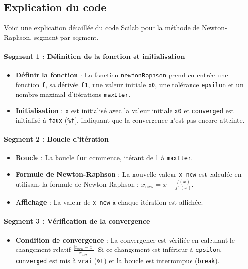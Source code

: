 \documentclass{article}
\begin{document}
\subsection{Explication du code}

Voici une explication détaillée du code Scilab pour la méthode de Newton-Raphson, segment par segment.

\paragraph{Segment 1 : Définition de la fonction et initialisation}
\begin{itemize}
    \item \textbf{Définir la fonction} : La fonction \texttt{newtonRaphson} prend en entrée une fonction \texttt{f}, sa dérivée \texttt{f1}, une valeur initiale \texttt{x0}, une tolérance \texttt{epsilon} et un nombre maximal d'itérations \texttt{maxIter}.
    \item \textbf{Initialisation} : \texttt{x} est initialisé avec la valeur initiale \texttt{x0} et \texttt{converged} est initialisé à \texttt{faux} (\texttt{\%f}), indiquant que la convergence n'est pas encore atteinte.
\end{itemize}

\paragraph{Segment 2 : Boucle d'itération}
\begin{itemize}
    \item \textbf{Boucle} : La boucle \texttt{for} commence, itérant de 1 à \texttt{maxIter}.
    \item \textbf{Formule de Newton-Raphson} : La nouvelle valeur \texttt{x\_new} est calculée en utilisant la formule de Newton-Raphson : \( x_{\text{new}} = x - \frac{f(x)}{f1(x)} \).
    \item \textbf{Affichage} : La valeur de \texttt{x\_new} à chaque itération est affichée.
\end{itemize}

\paragraph{Segment 3 : Vérification de la convergence}
\begin{itemize}
    \item \textbf{Condition de convergence} : La convergence est vérifiée en calculant le changement relatif \(\frac{|x_{\text{new}} - x|}{x_{\text{new}}}\). Si ce changement est inférieur à \texttt{epsilon}, \texttt{converged} est mis à \texttt{vrai} (\texttt{\%t}) et la boucle est interrompue (\texttt{break}).
\end{itemize}
\end{document}

